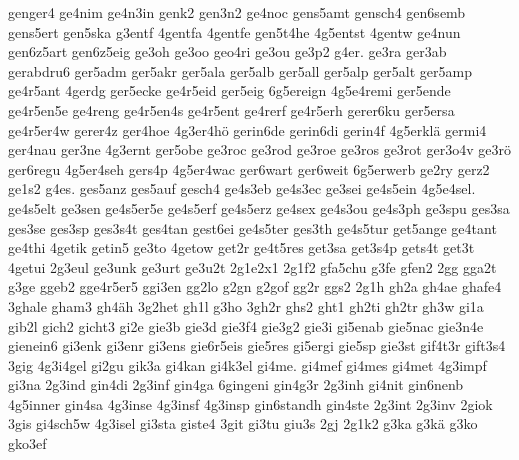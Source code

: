 {    genger4
    ge4nim
    ge4n3in
    genk2
    gen3n2
    ge4noc
    gens5amt
    gensch4
    gen6semb
    gens5ert
    gen5ska
    g3entf
    4gentfa
    4gentfe
    gen5t4he
    4g5entst
    4gentw
    ge4nun
    gen6z5art
    gen6z5eig
    ge3oh
    ge3oo
    geo4ri
    ge3ou
    ge3p2
    g4er.
    ge3ra
    ger3ab
    gerabdru6
    ger5adm
    ger5akr
    ger5ala
    ger5alb
    ger5all
    ger5alp
    ger5alt
    ger5amp
    ge4r5ant
    4gerdg
    ger5ecke
    ge4r5eid
    ger5eig
    6g5ereign
    4g5e4remi
    ger5ende
    ge4r5en5e
    ge4reng
    ge4r5en4s
    ge4r5ent
    ge4rerf
    ge4r5erh
    gerer6ku
    ger5ersa
    ge4r5er4w
    gerer4z
    ger4hoe
    4g3er4hö
    gerin6de
    gerin6di
    gerin4f
    4g5erklä
    germi4
    ger4nau
    ger3ne
    4g3ernt
    ger5obe
    ge3roc
    ge3rod
    ge3roe
    ge3ros
    ge3rot
    ger3o4v
    ge3rö
    ger6regu
    4g5er4seh
    gers4p
    4g5er4wac
    ger6wart
    ger6weit
    6g5erwerb
    ge2ry
    gerz2
    ge1s2
    g4es.
    ges5anz
    ges5auf
    gesch4
    ge4s3eb
    ge4s3ec
    ge3sei
    ge4s5ein
    4g5e4sel.
    ge4s5elt
    ge3sen
    ge4s5er5e
    ge4s5erf
    ge4s5erz
    ge4sex
    ge4s3ou
    ge4s3ph
    ge3spu
    ges3sa
    ges3se
    ges3sp
    ges3s4t
    ges4tan
    gest6ei
    ge4s5ter
    ges3th
    ge4s5tur
    get5ange
    ge4tant
    ge4thi
    4getik
    getin5
    ge3to
    4getow
    get2r
    ge4t5res
    get3sa
    get3s4p
    gets4t
    get3t
    4getui
    2g3eul
    ge3unk
    ge3urt
    ge3u2t
    2g1e2x1
    2g1f2
    gfa5chu
    g3fe
    gfen2
    2gg
    gga2t
    g3ge
    ggeb2
    gge4r5er5
    ggi3en
    gg2lo
    g2gn
    g2gof
    gg2r
    ggs2
    2g1h
    gh2a
    gh4ae
    ghafe4
    3ghale
    gham3
    gh4äh
    3g2het
    gh1l
    g3ho
    3gh2r
    ghs2
    ght1
    gh2ti
    gh2tr
    gh3w
    gi1a
    gib2l
    gich2
    gicht3
    gi2e
    gie3b
    gie3d
    gie3f4
    gie3g2
    gie3i
    gi5enab
    gie5nac
    gie3n4e
    gienein6
    gi3enk
    gi3enr
    gi3ens
    gie6r5eis
    gie5res
    gi5ergi
    gie5sp
    gie3st
    gif4t3r
    gift3s4
    3gig
    4g3i4gel
    gi2gu
    gik3a
    gi4kan
    gi4k3el
    gi4me.
    gi4mef
    gi4mes
    gi4met
    4g3impf
    gi3na
    2g3ind
    gin4di
    2g3inf
    gin4ga
    6gingeni
    gin4g3r
    2g3inh
    gi4nit
    gin6nenb
    4g5inner
    gin4sa
    4g3inse
    4g3insf
    4g3insp
    gin6standh
    gin4ste
    2g3int
    2g3inv
    2giok
    3gis
    gi4sch5w
    4g3isel
    gi3sta
    giste4
    3git
    gi3tu
    giu3s
    2gj
    2g1k2
    g3ka
    g3kä
    g3ko
    gko3ef
}
